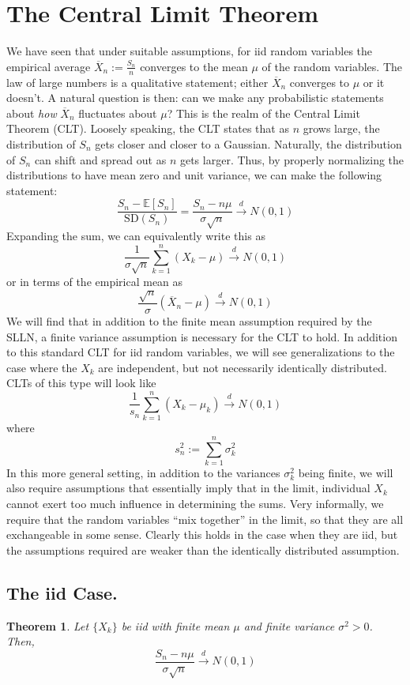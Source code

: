 \documentclass[12pt]{article}
\newcommand{\E}{\mathbb{E}}
\newtheorem{thm}{Theorem}
\begin{document}
\section{The Central Limit Theorem}
We have seen that under suitable assumptions, for iid random variables the empirical average $\overline{X}_n := \frac{S_n}{n}$ converges to the mean $\mu$ of the random variables. 
The law of large numbers is a qualitative statement; either $\overline{X}_n$ converges to $\mu$ or it doesn't. 
A natural question is then: can we make any probabilistic statements about \textit{how} $\overline{X}_n$ fluctuates about $\mu$? This is the realm of the Central Limit Theorem (CLT). 
Loosely speaking, the CLT states that as $n$ grows large, the distribution of $S_n$ gets closer and closer to a Gaussian. Naturally, the distribution of $S_n$ can shift and spread out 
as $n$ gets larger. Thus, by properly normalizing the distributions to have mean zero and unit variance, we can make the following statement: 
\[\frac{S_n - \E[S_n]}{\text{SD}(S_n)} = \frac{S_n - n\mu}{\sigma \sqrt{n}} \overset{d}{\to} N(0, 1)\]
Expanding the sum, we can equivalently write this as
\[\frac{1}{\sigma \sqrt{n}} \sum_{k = 1}^{n} (X_k - \mu) \overset{d}{\to} N(0, 1)\]
or in terms of the empirical mean as
\[\frac{\sqrt{n}}{\sigma} (\overline{X}_n - \mu) \overset{d}{\to} N(0, 1)\]
We will find that in addition to the finite mean assumption required by the SLLN, a finite variance assumption is necessary for the CLT to hold. 
In addition to this standard CLT for iid random variables, we will see generalizations to the case where the $X_k$ are independent, but not necessarily identically distributed. CLTs of 
this type will look like
\[\frac{1}{s_n} \sum_{k = 1}^{n} (X_k - \mu_k) \overset{d}{\to} N(0, 1)\]
where 
\[s_n^2 := \sum_{k = 1}^{n} \sigma_k^2 \]
In this more general setting, in addition to the variances $\sigma_k^2$ being finite, we will also require assumptions that essentially imply that in the limit, individual $X_k$ cannot exert
too much influence in determining the sums. Very informally, we require that the random variables ``mix together'' in the limit, so that they are all exchangeable in some sense. Clearly this 
holds in the case when they are iid, but the assumptions required are weaker than the identically distributed assumption. 

\subsection{The iid Case.}
\begin{thm}
Let $\{X_k\}$ be iid with finite mean $\mu$ and finite variance $\sigma^2 > 0$. Then, 
\[\frac{S_n - n\mu}{\sigma \sqrt{n}} \overset{d}{\to} N(0, 1)\]
\end{thm}
\end{document}
